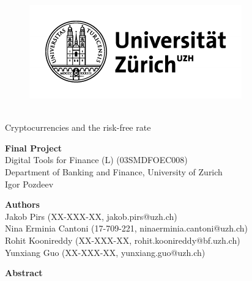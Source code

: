 \thispagestyle{empty}


\begin{figure}[!h]
\centering
\includegraphics{uzh_logo.pdf}\\\
\end{figure}
\vspace{1cm}

\begin{center}
\huge {Cryptocurrencies and the risk-free rate}
\end{center}
\vspace{1cm}

\begin{center}
\large \textbf{Final Project}\\
\vspace{0.5cm}
Digital Tools for Finance (L) (03SMDFOEC008)\\
Department of Banking and Finance, University of Zurich\\
Igor Pozdeev
\end{center}
\vspace{1cm}

\begin{center}
\large \textbf{Authors}\\
\vspace{0.5cm}
Jakob Pirs (XX-XXX-XX, jakob.pirs@uzh.ch)\\

Nina Erminia Cantoni (17-709-221, ninaerminia.cantoni@uzh.ch)\\

Rohit Koonireddy (XX-XXX-XX, rohit.koonireddy@bf.uzh.ch)\\

Yunxiang Guo (XX-XXX-XX, yunxiang.guo@uzh.ch)\\
\end{center}
\vspace{1cm}

\begin{center}
\large \textbf{Abstract}\\
\vspace{0.5cm}
\begin{justify}

\end{justify}
\end{center}
\vspace{1cm}


